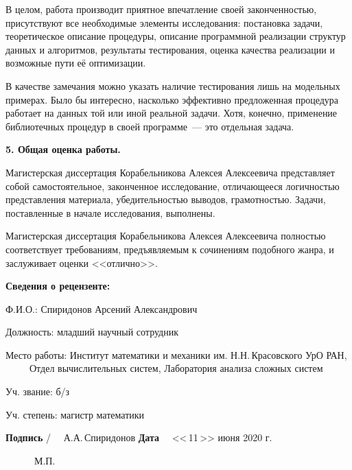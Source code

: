 \documentclass[12pt]{article}
\begin{document}
В целом, работа производит приятное впечатление своей законченностью, присутствуют все необходимые элементы исследования: постановка задачи, теоретическое описание процедуры, описание программной реализации структур данных и алгоритмов, результаты тестирования, оценка качества реализации и возможные пути её оптимизации.

В качестве замечания можно указать наличие тестирования лишь на модельных примерах. Было бы интересно, насколько эффективно предложенная процедура работает на данных той или иной реальной задачи. Хотя, конечно, применение библиотечных процедур в своей программе~--- это отдельная задача.

\smallskip

\noindent
\textbf{5. Общая оценка работы.}

\smallskip

Магистерская диссертация Корабельникова Алексея Алексеевича представляет собой самостоятельное, законченное исследование, отличающееся логичностью представления материала, убедительностью выводов, грамотностью. Задачи, поставленные в начале исследования, выполнены.

Магистерская диссертация Корабельникова Алексея Алексеевича полностью соответствует требованиям, предъявляемым к сочинениям подобного жанра, и заслуживает оценки <<отлично>>.

\bigskip

{
\raggedright

\noindent
\textbf{Сведения о рецензенте:}

Ф.И.О.: Спиридонов Арсений Александрович

Должность: младший научный сотрудник

Место работы: Институт математики и механики им. Н.Н.\,Красовского УрО РАН,\\
~~~~~Отдел вычислительных систем, Лаборатория анализа сложных систем

Уч. звание: б/з \hspace*{20mm}

Уч. степень: магистр математики

}

\bigskip
\bigskip
\bigskip

\noindent
\textbf{Подпись} %
%
\hspace*{5mm}%
%
\hspace*{8mm}%
{\large /}%
%
~~А.А.\,Спиридонов%
\hspace*{3cm}%
\textbf{Дата}
%
~~<<\,11\,>> июня 2020 г.

\bigskip

~~~~~~М.П.
\end{document}
